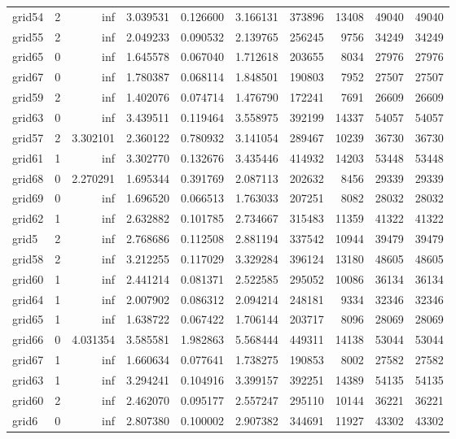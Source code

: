 \begin{longtable}{|l|r|r|r|r|r|r|r|r|r|}
grid54 & 2 & inf & 3.039531 & 0.126600 & 3.166131 & 373896 & 13408 & 49040 & 49040 \\
grid55 & 2 & inf & 2.049233 & 0.090532 & 2.139765 & 256245 & 9756 & 34249 & 34249 \\
grid65 & 0 & inf & 1.645578 & 0.067040 & 1.712618 & 203655 & 8034 & 27976 & 27976 \\
grid67 & 0 & inf & 1.780387 & 0.068114 & 1.848501 & 190803 & 7952 & 27507 & 27507 \\
grid59 & 2 & inf & 1.402076 & 0.074714 & 1.476790 & 172241 & 7691 & 26609 & 26609 \\
grid63 & 0 & inf & 3.439511 & 0.119464 & 3.558975 & 392199 & 14337 & 54057 & 54057 \\
grid57 & 2 & 3.302101 & 2.360122 & 0.780932 & 3.141054 & 289467 & 10239 & 36730 & 36730 \\
grid61 & 1 & inf & 3.302770 & 0.132676 & 3.435446 & 414932 & 14203 & 53448 & 53448 \\
grid68 & 0 & 2.270291 & 1.695344 & 0.391769 & 2.087113 & 202632 & 8456 & 29339 & 29339 \\
grid69 & 0 & inf & 1.696520 & 0.066513 & 1.763033 & 207251 & 8082 & 28032 & 28032 \\
grid62 & 1 & inf & 2.632882 & 0.101785 & 2.734667 & 315483 & 11359 & 41322 & 41322 \\
grid5 & 2 & inf & 2.768686 & 0.112508 & 2.881194 & 337542 & 10944 & 39479 & 39479 \\
grid58 & 2 & inf & 3.212255 & 0.117029 & 3.329284 & 396124 & 13180 & 48605 & 48605 \\
grid60 & 1 & inf & 2.441214 & 0.081371 & 2.522585 & 295052 & 10086 & 36134 & 36134 \\
grid64 & 1 & inf & 2.007902 & 0.086312 & 2.094214 & 248181 & 9334 & 32346 & 32346 \\
grid65 & 1 & inf & 1.638722 & 0.067422 & 1.706144 & 203717 & 8096 & 28069 & 28069 \\
grid66 & 0 & 4.031354 & 3.585581 & 1.982863 & 5.568444 & 449311 & 14138 & 53044 & 53044 \\
grid67 & 1 & inf & 1.660634 & 0.077641 & 1.738275 & 190853 & 8002 & 27582 & 27582 \\
grid63 & 1 & inf & 3.294241 & 0.104916 & 3.399157 & 392251 & 14389 & 54135 & 54135 \\
grid60 & 2 & inf & 2.462070 & 0.095177 & 2.557247 & 295110 & 10144 & 36221 & 36221 \\
grid6 & 0 & inf & 2.807380 & 0.100002 & 2.907382 & 344691 & 11927 & 43302 & 43302 \\

\end{longtable}
